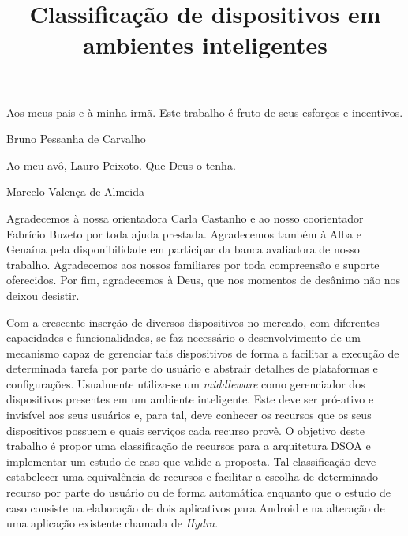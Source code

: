\documentclass[bacharelado]{unb-cic}
\title{Classificação de dispositivos em ambientes inteligentes}
\begin{document}
  \lstset{tabsize=4}
  \renewcommand\lstlistingname{Listagem}
  \renewcommand\lstlistlistingname{Listagens}
  \maketitle
  \pretextual

  \begin{dedicatoria}
  Aos meus pais e à minha irmã. Este trabalho é fruto de seus esforços e incentivos.
  \begin{flushright}Bruno Pessanha de Carvalho\end{flushright}

  Ao meu avô, Lauro Peixoto. Que Deus o tenha.
  \begin{flushright}Marcelo Valença de Almeida\end{flushright}
  \end{dedicatoria}

  \begin{agradecimentos}
  Agradecemos à nossa orientadora \dr[a] Carla Castanho e ao nosso coorientador Fabrício Buzeto por toda ajuda prestada. Agradecemos também à \dr[a] Alba e \dr[a] Genaína pela disponibilidade em participar da banca avaliadora de nosso trabalho. Agradecemos aos nossos familiares por toda compreensão e suporte oferecidos. Por fim, agradecemos à Deus, que nos momentos de desânimo não nos deixou desistir.
  \end{agradecimentos}

  \begin{resumo}
  Com a crescente inserção de diversos dispositivos no mercado, com diferentes capacidades e funcionalidades, se faz necessário o desenvolvimento de um mecanismo capaz de gerenciar tais dispositivos de forma a facilitar a execução de determinada tarefa por parte do usuário e abstrair detalhes de plataformas e configurações. Usualmente utiliza-se um \emph{middleware} como gerenciador dos dispositivos presentes em um ambiente inteligente. Este deve ser pró-ativo e invisível aos seus usuários e, para tal, deve conhecer os recursos que os seus dispositivos possuem e quais serviços cada recurso provê. O objetivo deste trabalho é propor uma classificação de recursos para a arquitetura DSOA e implementar um estudo de caso que valide a proposta. Tal classificação deve estabelecer uma equivalência de recursos e facilitar a escolha de determinado recurso por parte do usuário ou de forma automática enquanto que o estudo de caso consiste na elaboração de dois aplicativos para Android e na alteração de uma aplicação existente chamada de \emph{Hydra}. 
  \end{resumo}
\end{document}
